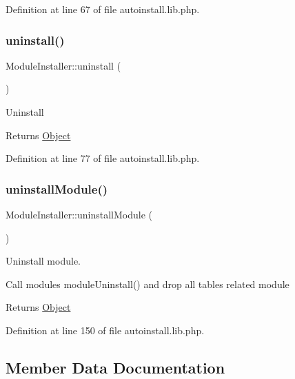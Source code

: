Definition at line 67 of file autoinstall.\+lib.\+php.

\mbox{\label{classModuleInstaller_a641ebe46305e7c320eec21a13d7e029f}} 
\subsubsection{\texorpdfstring{uninstall()}{uninstall()}}
{\footnotesize\ttfamily Module\+Installer\+::uninstall (\begin{DoxyParamCaption}{ }\end{DoxyParamCaption})}

Uninstall

\begin{DoxyReturn}{Returns}
\hyperlink{classObject}{Object} 
\end{DoxyReturn}


Definition at line 77 of file autoinstall.\+lib.\+php.

\mbox{\label{classModuleInstaller_a9ab463e12e9685dc42d4223b86a92754}} 
\subsubsection{\texorpdfstring{uninstall\+Module()}{uninstallModule()}}
{\footnotesize\ttfamily Module\+Installer\+::uninstall\+Module (\begin{DoxyParamCaption}{ }\end{DoxyParamCaption})}

Uninstall module.

Call module\textquotesingle{}s module\+Uninstall() and drop all tables related module

\begin{DoxyReturn}{Returns}
\hyperlink{classObject}{Object} 
\end{DoxyReturn}


Definition at line 150 of file autoinstall.\+lib.\+php.



\subsection{Member Data Documentation}
\mbox{\label{classModuleInstaller_a292b18d8c31dfa2cbac3bf90520b7128}} 
